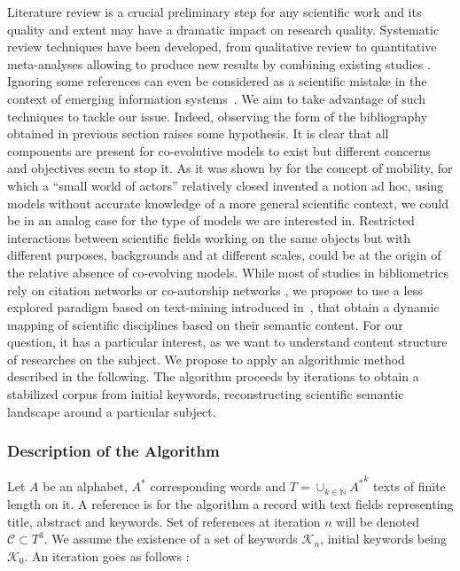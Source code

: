 Literature review is a crucial preliminary step for any scientific work and its quality and extent may have a dramatic impact on research quality. Systematic review techniques have been developed, from qualitative review to quantitative meta-analyses allowing to produce new results by combining existing studies \cite{rucker2012network}. Ignoring some references can even be considered as a scientific mistake in the context of emerging information systems~\cite{lissacksubliminal}. We aim to take advantage of such techniques to tackle our issue.
Indeed, observing the form of the bibliography obtained in previous section raises some hypothesis. It is clear that all components are present for co-evolutive models to exist but different concerns and objectives seem to stop it. As it was shown by \cite{commenges:tel-00923682} for the concept of mobility, for which a ``small world of actors'' relatively closed invented a notion ad hoc, using models without accurate knowledge of a more general scientific context, we could be in an analog case for the type of models we are interested in. Restricted interactions between scientific fields working on the same objects but with different purposes, backgrounds and at different scales, could be at the origin of the relative absence of co-evolving models. 
While most of studies in bibliometrics rely on citation networks \cite{2013arXiv1310.8220N} or co-autorship networks \cite{2014arXiv1402.7268S}, we propose to use a less explored paradigm based on text-mining introduced in~\cite{chavalarias2013phylomemetic}, that obtain a dynamic mapping of scientific disciplines based on their semantic content. For our question, it has a particular interest, as we want to understand content structure of researches on the subject. We propose to apply an algorithmic method described in the following. The algorithm proceeds by iterations to obtain a stabilized corpus from initial keywords, reconstructing scientific semantic landscape around a particular subject.

\subsubsection{Description of the Algorithm}

Let $A$ be an alphabet, $A^{\ast}$ corresponding words and $T = \cup_{k\in \mathbb{N}} {A^{\ast}}^k$ texts of finite length on it. A reference is for the algorithm a record with text fields representing title, abstract and keywords. Set of references at iteration $n$ will be denoted $\mathcal{C} \subset T^3$. We assume the existence of a set of keywords $\mathcal{K}_n$, initial keywords being $\mathcal{K}_0$. An iteration goes as follows :

